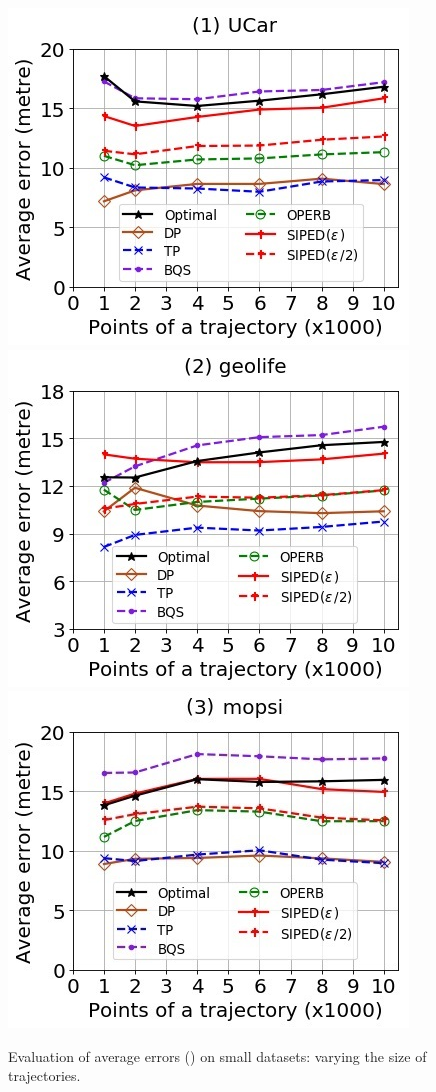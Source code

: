 \begin{figure}[tb!]
	\centering
	\includegraphics[scale=0.500]{Figures/Exp-PED-error-size-service.jpg} 	\hspace{2ex}
	\includegraphics[scale=0.500]{Figures/Exp-PED-error-size-geolife.jpg}	\hspace{2ex}
	\includegraphics[scale=0.500]{Figures/Exp-PED-error-size-mopsi.jpg}		
	\vspace{-2ex}
	\caption{\small Evaluation of average errors (\ped) on small datasets: varying the size of
		trajectories.}
	\label{fig:ae-ped-size}
	\vspace{-2ex}
\end{figure}

